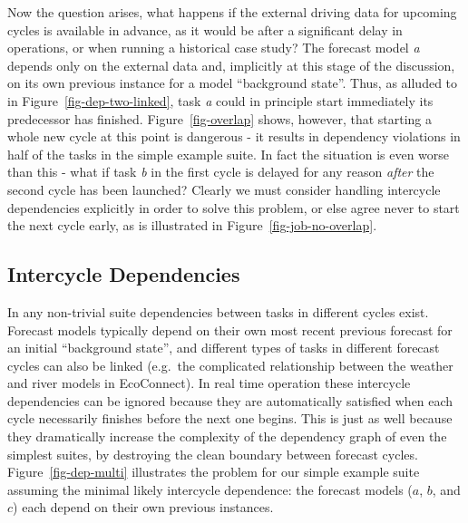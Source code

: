 \documentclass[11pt,a4paper]{article}
\begin{document}
Now the question arises, what happens if the external driving data for
upcoming cycles is available in advance, as it would be after a
significant delay in operations, or when running a historical case
study?  The forecast model {\em a} depends only on the external data
and, implicitly at this stage of the discussion, on its own previous
instance for a model ``background state''. Thus, as alluded to in
Figure~\ref{fig-dep-two-linked}, task {\em a} could in principle start
immediately its predecessor has finished.  Figure~\ref{fig-overlap}
shows, however, that starting a whole new cycle at this point is
dangerous - it results in dependency violations in half of the tasks in
the simple example suite. In fact the situation is even worse than this
- what if task {\em b} in the first cycle is delayed for any reason {\em
after} the second cycle has been launched? Clearly we must consider
handling intercycle dependencies explicitly in order to solve this
problem, or else agree never to start the next cycle early, as
is illustrated in Figure~\ref{fig-job-no-overlap}.


\subsection{Intercycle Dependencies} 
\label{IntercycleDependencies}

In any non-trivial suite dependencies between tasks in different cycles
exist. Forecast models typically depend on their own most recent
previous forecast for an initial ``background state'', and different
types of tasks in different forecast cycles can also be linked (e.g.\
the complicated relationship between the weather and river models in
EcoConnect). In real time operation these intercycle dependencies
can be ignored because they are automatically satisfied when each cycle
necessarily finishes before the next one begins. This is just as well
because they dramatically increase the complexity of the dependency
graph of even the simplest suites, by destroying the clean boundary
between forecast cycles. Figure~\ref{fig-dep-multi} illustrates the
problem for our simple example suite assuming the minimal likely
intercycle dependence: the forecast models ($a$, $b$, and $c$) each
depend on their own previous instances.
\end{document}
